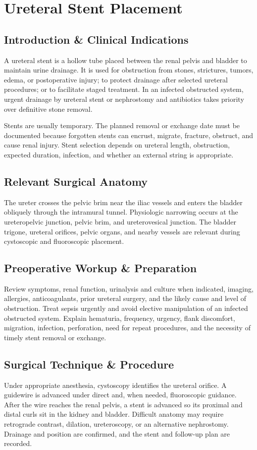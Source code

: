 \chapter{Ureteral Stent Placement}

\section*{Introduction \& Clinical Indications}
A ureteral stent is a hollow tube placed between the renal pelvis and bladder to maintain urine drainage. It is used for obstruction from stones, strictures, tumors, edema, or postoperative injury; to protect drainage after selected ureteral procedures; or to facilitate staged treatment. In an infected obstructed system, urgent drainage by ureteral stent or nephrostomy and antibiotics takes priority over definitive stone removal.

Stents are usually temporary. The planned removal or exchange date must be documented because forgotten stents can encrust, migrate, fracture, obstruct, and cause renal injury. Stent selection depends on ureteral length, obstruction, expected duration, infection, and whether an external string is appropriate.

\section*{Relevant Surgical Anatomy}
The ureter crosses the pelvic brim near the iliac vessels and enters the bladder obliquely through the intramural tunnel. Physiologic narrowing occurs at the ureteropelvic junction, pelvic brim, and ureterovesical junction. The bladder trigone, ureteral orifices, pelvic organs, and nearby vessels are relevant during cystoscopic and fluoroscopic placement.

\section*{Preoperative Workup \& Preparation}
Review symptoms, renal function, urinalysis and culture when indicated, imaging, allergies, anticoagulants, prior ureteral surgery, and the likely cause and level of obstruction. Treat sepsis urgently and avoid elective manipulation of an infected obstructed system. Explain hematuria, frequency, urgency, flank discomfort, migration, infection, perforation, need for repeat procedures, and the necessity of timely stent removal or exchange.

\section*{Surgical Technique \& Procedure}
Under appropriate anesthesia, cystoscopy identifies the ureteral orifice. A guidewire is advanced under direct and, when needed, fluoroscopic guidance. After the wire reaches the renal pelvis, a stent is advanced so its proximal and distal curls sit in the kidney and bladder. Difficult anatomy may require retrograde contrast, dilation, ureteroscopy, or an alternative nephrostomy. Drainage and position are confirmed, and the stent and follow-up plan are recorded.

